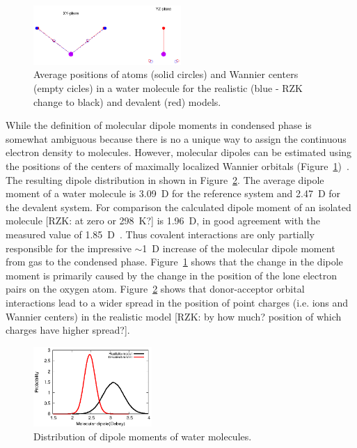 \documentclass[aps,prl,reprint,amsmath,amssymb]{revtex4-1}
\begin{document}
\begin{figure}
\includegraphics[width=0.5\textwidth]{acoord}
\caption{Average positions of atoms (solid circles) and Wannier centers (empty cicles) in a water molecule for the realistic (blue - RZK change to black) and devalent (red) models. 
} \label{Fig:acoord}
\end{figure}

While the definition of molecular dipole moments in condensed phase is somewhat ambiguous because there is no a unique way to assign the continuous electron density to molecules. However, molecular dipoles can be estimated using the positions of the centers of maximally localized Wannier orbitals (Figure~\ref{Fig:acoord})~\cite{RZK-wannier-water}. 
The resulting dipole distribution in shown in Figure~\ref{Fig:dipoledist}. 
The average dipole moment of a water molecule is 3.09~D for the reference system and 2.47~D for the devalent system. For comparison the calculated dipole moment of an isolated molecule [RZK: at zero or 298~K?] is 1.96~D, in good agreement with the measured value of 1.85~D~\cite{RZK-CRC}. 
%
Thus covalent interactions are only partially responsible for the impressive $\sim$1~D increase of the molecular dipole moment from gas to the condensed phase. 
Figure~\ref{Fig:acoord} shows that the change in the dipole moment is primarily caused by the change in the position of the lone electron pairs on the oxygen atom. 
\new
Figure~\ref{Fig:dipoledist} shows that donor-acceptor orbital interactions lead to a wider spread in the position of point charges (i.e. ions and Wannier centers) in the realistic model [RZK: by how much? position of which charges have higher spread?]. 
\old 

\begin{figure}
\includegraphics[width=0.4\textwidth]{new_dipole}
\caption{Distribution of dipole moments of water molecules.} \label{Fig:dipoledist}
\end{figure}
\end{document}
